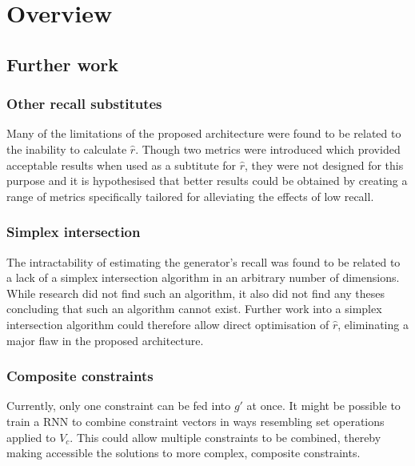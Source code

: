 \documentclass[../../main.tex]{subfiles}
\begin{document}
\chapter{Overview} \label{chapter:overview}

\section{Further work} \label{section:furtherWork}

\subsection{Other recall substitutes} \label{subsection:otherRecallSubstitutes}

Many of the limitations of the proposed architecture were found to be related to the inability to calculate $\hat{r}$.
Though two metrics were introduced which provided acceptable results when used as a subtitute for $\hat{r}$, they were not designed for this purpose and it is hypothesised that better results could be obtained by creating a range of metrics specifically tailored for alleviating the effects of low recall.

\subsection{Simplex intersection} \label{subsection:simplexIntersection}

The intractability of estimating the generator's recall was found to be related to a lack of a simplex intersection algorithm in an arbitrary number of dimensions.
While research did not find such an algorithm, it also did not find any theses concluding that such an algorithm cannot exist.
Further work into a simplex intersection algorithm could therefore allow direct optimisation of $\hat{r}$, eliminating a major flaw in the proposed architecture.

\subsection{Composite constraints} \label{subsection:compositeConstraints}

Currently, only one constraint can be fed into $g'$ at once.
It might be possible to train a RNN to combine constraint vectors in ways resembling set operations applied to $V_c$.
This could allow multiple constraints to be combined, thereby making accessible the solutions to more complex, composite constraints.
\end{document}
